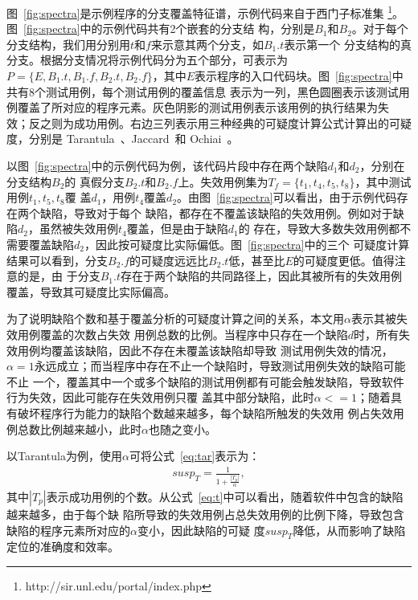 图~\ref{fig:spectra}是示例程序的分支覆盖特征谱，示例代码来自于西门子标准集
\footnote{http://sir.unl.edu/portal/index.php}。图~\ref{fig:spectra}中的示例代码共有2个嵌套的分支结
构，分别是$B_1$和$B_2$。对于每个分支结构，我们用分别用$t$和$f$来示意其两个分支，如$B_1.t$表示第一个
分支结构的真分支。根据分支情况将示例代码分为五个部分，可表示为$P = \{E, B_1.t, B_1.f, B_2.t,
B_2.f\}$，其中$E$表示程序的入口代码块。图~\ref{fig:spectra}中共有8个测试用例，每个测试用例的覆盖信息
表示为一列，黑色圆圈表示该测试用例覆盖了所对应的程序元素。灰色阴影的测试用例表示该用例的执行结果为失
效；反之则为成功用例。右边三列表示用三种经典的可疑度计算公式计算出的可疑度，分别是
Tarantula~\cite{jones2005empirical}、Jaccard~\cite{abreu2007accuracy}和
Ochiai~\cite{abreu2007accuracy}。

以图~\ref{fig:spectra}中的示例代码为例，该代码片段中存在两个缺陷$d_1$和$d_2$，分别在分支结构$B_2$的
真假分支$B_2.t$和$B_2.f$上。失效用例集为$T_f=\{t_1, t_4, t_5, t_8\}$，其中测试用例$t_1, t_5, t_8$覆
盖$d_1$，用例$t_4$覆盖$d_2$。由图~\ref{fig:spectra}可以看出，由于示例代码存在两个缺陷，导致对于每个
缺陷，都存在不覆盖该缺陷的失效用例。例如对于缺陷$d_2$，虽然被失效用例$t_4$覆盖，但是由于缺陷$d_1$的
存在，导致大多数失效用例都不需要覆盖缺陷$d_2$，因此按可疑度比实际偏低。图~\ref{fig:spectra}中的三个
可疑度计算结果可以看到，分支$B_2.f$的可疑度远远比$B_2.t$低，甚至比$E$的可疑度更低。值得注意的是，由
于分支$B_1.t$存在于两个缺陷的共同路径上，因此其被所有的失效用例覆盖，导致其可疑度比实际偏高。

为了说明缺陷个数和基于覆盖分析的可疑度计算之间的关系，本文用$\alpha$表示其被失效用例覆盖的次数占失效
用例总数的比例。当程序中只存在一个缺陷$d$时，所有失效用例均覆盖该缺陷，因此不存在未覆盖该缺陷却导致
测试用例失效的情况，$\alpha=1$永远成立；而当程序中存在不止一个缺陷时，导致测试用例失效的缺陷可能不止
一个，覆盖其中一个或多个缺陷的测试用例都有可能会触发缺陷，导致软件行为失效，因此可能存在失效用例只覆
盖其中部分缺陷，此时$\alpha<=1$；随着具有破坏程序行为能力的缺陷个数越来越多，每个缺陷所触发的失效用
例占失效用例总数比例越来越小，此时$\alpha$也随之变小。

以Tarantula\cite{jones2005empirical}为例，使用$\alpha$可将公式~\eqref{eq:tar}表示为：
\begin{eqnarray}
 susp_T = \frac{1}{1+\frac{|T_p|}{\alpha}}, \label{eq:t}
\end{eqnarray}
其中$|T_p|$表示成功用例的个数。从公式~\eqref{eq:t}中可以看出，随着软件中包含的缺陷越来越多，由于每个缺
陷所导致的失效用例占总失效用例的比例下降，导致包含缺陷的程序元素所对应的$\alpha$变小，因此缺陷的可疑
度$susp_T$降低，从而影响了缺陷定位的准确度和效率。

